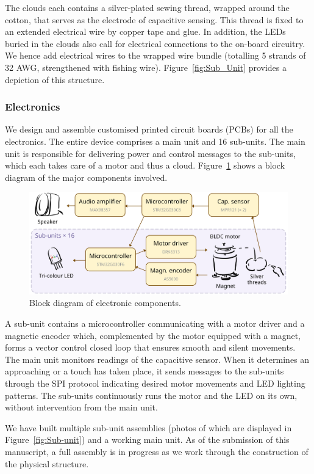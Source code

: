 \documentclass{nimemusic}
\begin{document}
The clouds each contains a silver-plated sewing thread, wrapped around the cotton, that serves as the electrode of capacitive sensing. This thread is fixed to an extended electrical wire by copper tape and glue. In addition, the LEDs buried in the clouds also call for electrical connections to the on-board circuitry. We hence add electrical wires to the wrapped wire bundle (totalling 5 strands of 32 AWG, strengthened with fishing wire). Figure~\ref{fig:Sub_Unit} provides a depiction of this structure.

\subsubsection{Electronics}
We design and assemble customised printed circuit boards (PCBs) for all the electronics. The entire device comprises a main unit and 16 sub-units. The main unit is responsible for delivering power and control messages to the sub-units, which each takes care of a motor and thus a cloud. Figure~\ref{fig:Block} shows a block diagram of the major components involved.

\begin{figure}[h!]
  \includegraphics[width=1\textwidth]{Block.pdf}
  \caption{Block diagram of electronic components.}
  \label{fig:Block}
\end{figure}

A sub-unit contains a microcontroller communicating with a motor driver and a magnetic encoder which, complemented by the motor equipped with a magnet, forms a vector control closed loop that ensures smooth and silent movements. The main unit monitors readings of the capacitive sensor. When it determines an approaching or a touch has taken place, it sends messages to the sub-units through the SPI protocol indicating desired motor movements and LED lighting patterns. The sub-units continuously runs the motor and the LED on its own, without intervention from the main unit.

We have built multiple sub-unit assemblies (photos of which are displayed in Figure~\ref{fig:Sub-unit}) and a working main unit. As of the submission of this manuscript, a full assembly is in progress as we work through the construction of the physical structure.
\end{document}
